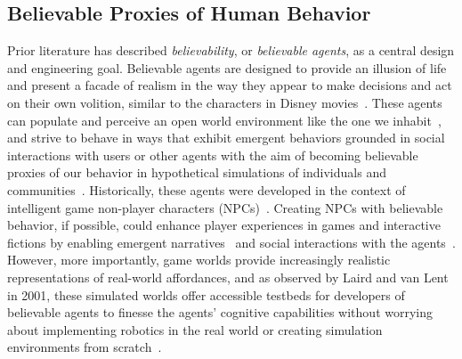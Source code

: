 \subsection{Believable Proxies of Human Behavior} Prior literature has described \textit{believability}, or \textit{believable agents}, as a central design and engineering goal. Believable agents are designed to provide an illusion of life and present a facade of realism in the way they appear to make decisions and act on their own volition, similar to the characters in Disney movies~\cite{22_bates1994role, 42_Thomas1981Disney}. These agents can populate and perceive an open world environment like the one we inhabit~\cite{4_laird2001human, 22_bates1994role}, and strive to behave in ways that exhibit emergent behaviors grounded in social interactions with users or other agents with the aim of becoming believable proxies of our behavior in hypothetical simulations of individuals and communities~\cite{26_mccoy2012prom, 43_Burkinshaw2009Alice, 44_Francis2010Minecraft}. Historically, these agents were developed in the context of intelligent game non-player characters (NPCs)~\cite{4_laird2001human, 6_riedl2012interactive}. Creating NPCs with believable behavior, if possible, could enhance player experiences in games and interactive fictions by enabling emergent narratives~\cite{1_swartout2006toward, 2_aylett1999narrative, 3_brenner2010creating, ibister2000consistency} and social interactions with the agents~\cite{5_zubek2002towards}. However, more importantly, game worlds provide increasingly realistic representations of real-world affordances, and as observed by Laird and van Lent in 2001, these simulated worlds offer accessible testbeds for developers of believable agents to finesse the agents' cognitive capabilities without worrying about implementing robotics in the real world or creating simulation environments from scratch~\cite{4_laird2001human, 6_riedl2012interactive}.

